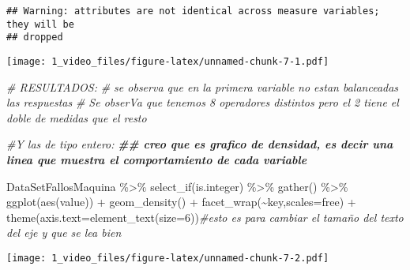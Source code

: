 \documentclass[
]{article}
\newenvironment{Shaded}{\begin{snugshade}}{\end{snugshade}}
\newcommand{\AttributeTok}[1]{\textcolor[rgb]{0.77,0.63,0.00}{#1}}
\newcommand{\CommentTok}[1]{\textcolor[rgb]{0.56,0.35,0.01}{\textit{#1}}}
\newcommand{\DecValTok}[1]{\textcolor[rgb]{0.00,0.00,0.81}{#1}}
\newcommand{\DocumentationTok}[1]{\textcolor[rgb]{0.56,0.35,0.01}{\textbf{\textit{#1}}}}
\newcommand{\FunctionTok}[1]{\textcolor[rgb]{0.00,0.00,0.00}{#1}}
\newcommand{\NormalTok}[1]{#1}
\newcommand{\SpecialCharTok}[1]{\textcolor[rgb]{0.00,0.00,0.00}{#1}}
\newcommand{\StringTok}[1]{\textcolor[rgb]{0.31,0.60,0.02}{#1}}
\begin{document}
\begin{verbatim}
## Warning: attributes are not identical across measure variables; they will be
## dropped
\end{verbatim}

\texttt{[image: 1\_video\_files/figure-latex/unnamed-chunk-7-1.pdf]}

\begin{Shaded}
\begin{Highlighting}[]
\CommentTok{\# RESULTADOS:}
\CommentTok{\# se observa que en la primera variable no estan balanceadas las respuestas}
\CommentTok{\# Se obserVa que tenemos 8 operadores distintos pero el 2 tiene el doble de medidas que el resto}


\CommentTok{\#Y las de tipo entero:}
\DocumentationTok{\#\# creo que es grafico de densidad, es decir una linea que muestra el comportamiento de cada variable}

\NormalTok{DataSetFallosMaquina }\SpecialCharTok{\%\textgreater{}\%}
  \FunctionTok{select\_if}\NormalTok{(is.integer) }\SpecialCharTok{\%\textgreater{}\%}
  \FunctionTok{gather}\NormalTok{() }\SpecialCharTok{\%\textgreater{}\%}
  \FunctionTok{ggplot}\NormalTok{(}\FunctionTok{aes}\NormalTok{(value)) }\SpecialCharTok{+} \FunctionTok{geom\_density}\NormalTok{() }\SpecialCharTok{+} \FunctionTok{facet\_wrap}\NormalTok{(}\SpecialCharTok{\textasciitilde{}}\NormalTok{key,}\AttributeTok{scales=}\StringTok{\textquotesingle{}free\textquotesingle{}}\NormalTok{) }\SpecialCharTok{+}
  \FunctionTok{theme}\NormalTok{(}\AttributeTok{axis.text=}\FunctionTok{element\_text}\NormalTok{(}\AttributeTok{size=}\DecValTok{6}\NormalTok{))}\CommentTok{\#esto es para cambiar el tamaño del texto del eje y que se lea bien}
\end{Highlighting}
\end{Shaded}

\texttt{[image: 1\_video\_files/figure-latex/unnamed-chunk-7-2.pdf]}
\end{document}

